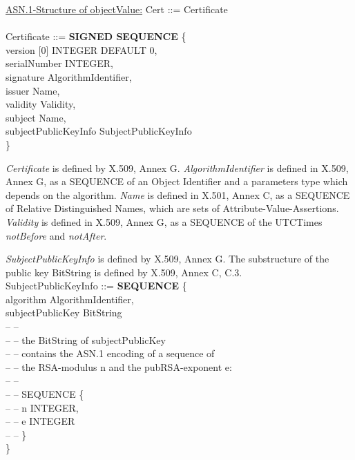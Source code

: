 \underline{ASN.1-Structure of objectValue:}
{\small
\bvtab
\1 Cert ::=    \3 Certificate \\ \\
\1 Certificate ::= \3 {\bf SIGNED SEQUENCE} \{  \\
\5 version [0]          \5 INTEGER DEFAULT 0,          \\
\5 serialNumber         \5 INTEGER,                    \\
\5 signature            \5 AlgorithmIdentifier,        \\
\5 issuer               \5 Name,                       \\
\5 validity             \5 Validity,                   \\
\5 subject              \5 Name,                       \\
\5 subjectPublicKeyInfo \5 SubjectPublicKeyInfo     \\
\4 \}
\evtab
}
 
{\em Certificate} is defined by X.509, Annex G.
{\em Algorithm\-Identifier} is defined in X.509, Annex G,
as a SEQUENCE of an Object Identifier and a parameters type
which depends on the algorithm.
{\em Name} is defined in X.501, Annex C,
as a SEQUENCE of Relative Distinguished Names,
which are sets of Attribute-Value-Assertions.
{\em Validity} is defined in X.509, Annex G,
as a SEQUENCE of the UTCTimes {\em notBefore} and {\em notAfter}.


{\em SubjectPublicKeyInfo} is defined by X.509, Annex G.
The substructure of the public key BitString is defined by
X.509, Annex C, C.3.
\\ [1em]

{\small
\bvtab
\1 SubjectPublicKeyInfo ::= \5 {\bf SEQUENCE} \{  \\
\7 algorithm         \2 AlgorithmIdentifier,    \\
\7 subjectPublicKey  BitString            \\
\7 -- -- \\
\7 -- -- the BitString of subjectPublicKey   \\
\7 -- -- contains the ASN.1 encoding of a sequence of \\
\7 -- -- the RSA-modulus n and the pubRSA-exponent e:   \\
\7 -- -- \\
\7 -- -- SEQUENCE \{ \\
\7 -- -- \2       n INTEGER,   \\
\7 -- -- \2       e INTEGER  \\
\7 -- -- \} \\
\6 \} \\
\evtab
}

